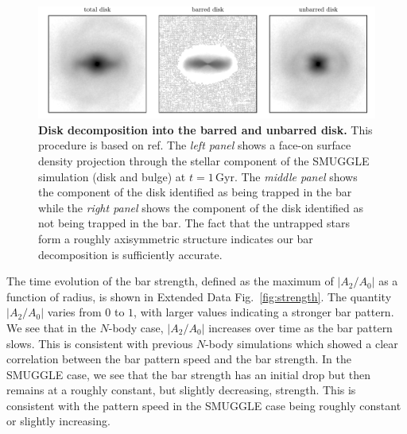 \documentclass[twoside]{natureprintstyle}
\newcommand{\Nbody}{$N$-body}
\newcommand{\SMUGGLE}{SMUGGLE}
\begin{document}
\begin{figure}[t!]%
\centering
\includegraphics[width=18cm]{fig/bar_decomp.pdf}
\caption{\textbf{Disk decomposition into the barred and unbarred disk.} This
procedure is based on ref.\cite{2016MNRAS.463.1952P} The \textit{left panel}
shows a face-on surface density projection through the stellar component of the
\SMUGGLE{} simulation (disk and bulge) at $t=1\,\textrm{Gyr}$. The \textit{middle panel} shows the
component of the disk identified as being trapped in the bar while the
\textit{right panel} shows the component of the disk identified as not being
trapped in the bar. The fact that the untrapped stars form a roughly
axisymmetric structure indicates our bar decomposition is sufficiently
accurate.}
\label{fig:decomp}
\end{figure}

The time evolution of the bar strength, defined as the maximum of
$\left|A_2/A_0\right|$ as a function of radius, is shown in Extended Data
Fig.~\ref{fig:strength}. The quantity $\left|A_2/A_0\right|$ varies from $0$
to $1$, with larger values indicating a stronger bar pattern. We see that in
the \Nbody{} case, $\left|A_2/A_0\right|$ increases over time as the bar pattern
slows. This is consistent with previous \Nbody{} simulations which showed a
clear correlation between the bar pattern speed and the bar
strength.\cite{2003MNRAS.341.1179A} In the SMUGGLE case, we see that the bar
strength has an initial drop but then remains at a roughly constant, but
slightly decreasing, strength. This is consistent with the pattern speed in the
SMUGGLE case being roughly constant or slightly increasing.
\end{document}
